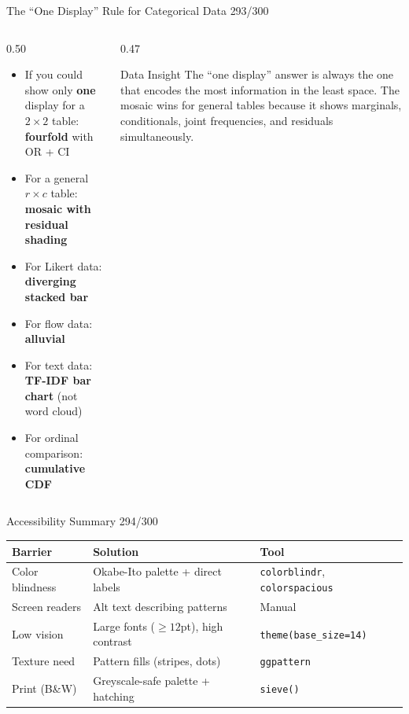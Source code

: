 \documentclass[10pt]{beamer}
\newcommand{\smark}[1]{\hfill{\scriptsize\color{codegray}#1}}
\begin{document}
\begin{frame}{The ``One Display'' Rule for Categorical Data}
\smark{293/300}
\begin{columns}[T]
\begin{column}{0.50\textwidth}
\begin{itemize}
    \item If you could show only \textbf{one} display for a $2 \times 2$ table: \textbf{fourfold} with OR + CI
    \item For a general $r \times c$ table: \textbf{mosaic with residual shading}
    \item For Likert data: \textbf{diverging stacked bar}
    \item For flow data: \textbf{alluvial}
    \item For text data: \textbf{TF-IDF bar chart} (not word cloud)
    \item For ordinal comparison: \textbf{cumulative CDF}
\end{itemize}
\end{column}
\begin{column}{0.47\textwidth}
\begin{exampleblock}{Data Insight}
    \scriptsize The ``one display'' answer is always the one that encodes the most information in the least space. The mosaic wins for general tables because it shows marginals, conditionals, joint frequencies, and residuals simultaneously.
\end{exampleblock}
\end{column}
\end{columns}
\end{frame}

\begin{frame}{Accessibility Summary}
\smark{294/300}
\centering\small
\begin{tabular}{@{}lll@{}}
    \toprule
    \textbf{Barrier} & \textbf{Solution} & \textbf{Tool} \\
    \midrule
    Color blindness    & Okabe-Ito palette + direct labels   & \texttt{colorblindr}, \texttt{colorspacious} \\
    Screen readers     & Alt text describing patterns         & Manual \\
    Low vision         & Large fonts ($\geq 12$pt), high contrast & \texttt{theme(base\_size=14)} \\
    Texture need       & Pattern fills (stripes, dots)        & \texttt{ggpattern} \\
    Print (B\&W)       & Greyscale-safe palette + hatching    & \texttt{sieve()} \\
    \bottomrule
\end{tabular}
\end{frame}
\end{document}
